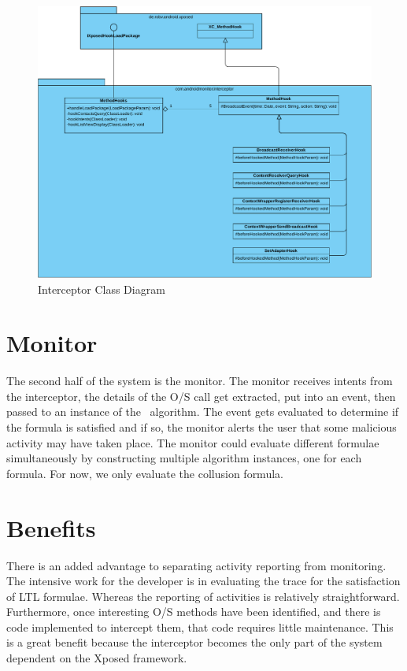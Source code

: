 \begin{figure}[h]
  \centering
  \includegraphics[width=\textwidth]{graphics/InterceptorClassDiagram.pdf}
  \caption{Interceptor Class Diagram}
  \label{fig:interceptorClassDiagram}
\end{figure}

\section{Monitor}
\label{sec:Monitor}

The second half of the system is the monitor.  The monitor receives intents from the interceptor, the details of the O/S call get extracted, put into an event, then passed to an instance of the \RH\ algorithm.  The event gets evaluated to determine if the formula is satisfied and if so, the monitor alerts the user that some malicious activity may have taken place.  The monitor could evaluate different formulae simultaneously by constructing multiple algorithm instances, one for each formula.  For now, we only evaluate the collusion formula.

\section{Benefits}
\label{sec:Benefits}

There is an added advantage to separating activity reporting from monitoring.  The intensive work for the developer is in evaluating the trace for the satisfaction of LTL formulae.  Whereas the reporting of activities is relatively straightforward.  Furthermore, once interesting O/S methods have been identified, and there is code implemented to intercept them, that code requires little maintenance.  This is a great benefit because the interceptor becomes the only part of the system dependent on the Xposed framework.

